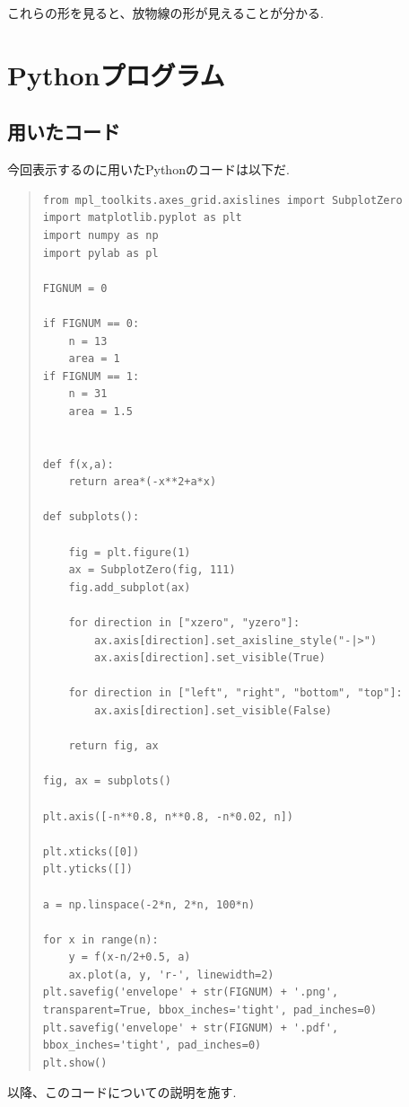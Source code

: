 \documentclass[11pt,a4j,fleqn]{jarticle}
\begin{document}
これらの形を見ると、放物線の形が見えることが分かる.

\section{Pythonプログラム}

\subsection{用いたコード}

今回表示するのに用いたPythonのコードは以下だ.
\begin{quote}
\begin{verbatim}
from mpl_toolkits.axes_grid.axislines import SubplotZero
import matplotlib.pyplot as plt
import numpy as np
import pylab as pl

FIGNUM = 0

if FIGNUM == 0:
    n = 13
    area = 1
if FIGNUM == 1:
    n = 31
    area = 1.5


def f(x,a):
    return area*(-x**2+a*x)

def subplots():
    
    fig = plt.figure(1)
    ax = SubplotZero(fig, 111)
    fig.add_subplot(ax)

    for direction in ["xzero", "yzero"]:
        ax.axis[direction].set_axisline_style("-|>")
        ax.axis[direction].set_visible(True)

    for direction in ["left", "right", "bottom", "top"]:
        ax.axis[direction].set_visible(False)

    return fig, ax

fig, ax = subplots() 

plt.axis([-n**0.8, n**0.8, -n*0.02, n])

plt.xticks([0])
plt.yticks([])

a = np.linspace(-2*n, 2*n, 100*n)

for x in range(n):
    y = f(x-n/2+0.5, a)
    ax.plot(a, y, 'r-', linewidth=2)
plt.savefig('envelope' + str(FIGNUM) + '.png', 
transparent=True, bbox_inches='tight', pad_inches=0)
plt.savefig('envelope' + str(FIGNUM) + '.pdf', 
bbox_inches='tight', pad_inches=0)
plt.show()
\end{verbatim}
\end{quote}

以降、このコードについての説明を施す.
\end{document}
